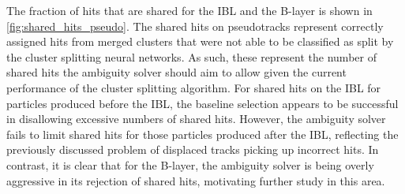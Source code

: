 The fraction of hits that are shared for the IBL and the B-layer is shown in \cref{fig:shared_hits_pseudo}.
The shared hits on pseudotracks represent correctly assigned hits from merged clusters that were not able to be classified as split by the cluster splitting neural networks.
As such, these represent the number of shared hits the ambiguity solver should aim to allow given the current performance of the cluster splitting algorithm.
For shared hits on the IBL for particles produced before the IBL, the baseline selection appears to be successful in disallowing excessive numbers of shared hits.
However, the ambiguity solver fails to limit shared hits for those particles produced after the IBL, reflecting the previously discussed problem of displaced tracks picking up incorrect hits.
In contrast, it is clear that for the B-layer, the ambiguity solver is being overly aggressive in its rejection of shared hits, motivating further study in this area.

